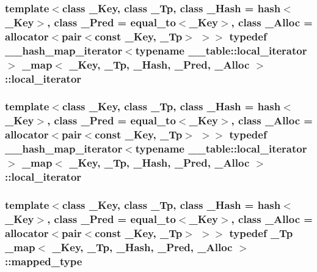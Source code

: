 \subsubsection[{local\+\_\+iterator}]{\setlength{\rightskip}{0pt plus 5cm}template$<$class \+\_\+\+Key, class \+\_\+\+Tp, class \+\_\+\+Hash = hash$<$\+\_\+\+Key$>$, class \+\_\+\+Pred = equal\+\_\+to$<$\+\_\+\+Key$>$, class \+\_\+\+Alloc = allocator$<$pair$<$const \+\_\+\+Key, \+\_\+\+Tp$>$ $>$$>$ typedef {\bf \+\_\+\+\_\+hash\+\_\+map\+\_\+iterator}$<$typename \+\_\+\+\_\+table\+::local\+\_\+iterator$>$ {\bf \+\_\+map}$<$ \+\_\+\+Key, \+\_\+\+Tp, \+\_\+\+Hash, \+\_\+\+Pred, \+\_\+\+Alloc $>$\+::{\bf local\+\_\+iterator}}\label{class__map_a715fe122a46eecc92c19958b56ed91e4}
\hypertarget{class__map_a715fe122a46eecc92c19958b56ed91e4}{}
\subsubsection[{local\+\_\+iterator}]{\setlength{\rightskip}{0pt plus 5cm}template$<$class \+\_\+\+Key, class \+\_\+\+Tp, class \+\_\+\+Hash = hash$<$\+\_\+\+Key$>$, class \+\_\+\+Pred = equal\+\_\+to$<$\+\_\+\+Key$>$, class \+\_\+\+Alloc = allocator$<$pair$<$const \+\_\+\+Key, \+\_\+\+Tp$>$ $>$$>$ typedef {\bf \+\_\+\+\_\+hash\+\_\+map\+\_\+iterator}$<$typename \+\_\+\+\_\+table\+::local\+\_\+iterator$>$ {\bf \+\_\+map}$<$ \+\_\+\+Key, \+\_\+\+Tp, \+\_\+\+Hash, \+\_\+\+Pred, \+\_\+\+Alloc $>$\+::{\bf local\+\_\+iterator}}\label{class__map_a715fe122a46eecc92c19958b56ed91e4}
\hypertarget{class__map_a652392c4150010664c8b1b76e460ae0a}{}
\subsubsection[{mapped\+\_\+type}]{\setlength{\rightskip}{0pt plus 5cm}template$<$class \+\_\+\+Key, class \+\_\+\+Tp, class \+\_\+\+Hash = hash$<$\+\_\+\+Key$>$, class \+\_\+\+Pred = equal\+\_\+to$<$\+\_\+\+Key$>$, class \+\_\+\+Alloc = allocator$<$pair$<$const \+\_\+\+Key, \+\_\+\+Tp$>$ $>$$>$ typedef \+\_\+\+Tp {\bf \+\_\+map}$<$ \+\_\+\+Key, \+\_\+\+Tp, \+\_\+\+Hash, \+\_\+\+Pred, \+\_\+\+Alloc $>$\+::{\bf mapped\+\_\+type}}\label{class__map_a652392c4150010664c8b1b76e460ae0a}
\hypertarget{class__map_a652392c4150010664c8b1b76e460ae0a}{}
